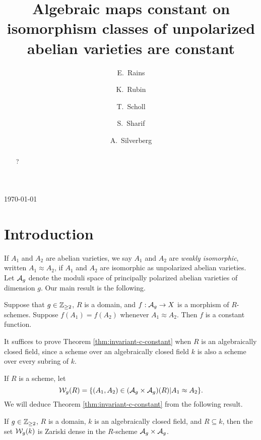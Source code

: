 \documentclass{amsart}
\title[Algebraic maps constant on unpolarized isomorphism classes]{Algebraic maps constant on isomorphism classes of unpolarized abelian varieties are constant}
\author[E.\ Rains]{E.\ Rains}
\author[K.\ Rubin]{K.\ Rubin}
\author[T.\ Scholl]{T.\ Scholl}
\author[S.\ Sharif]{S.\ Sharif}
\author[A.\ Silverberg]{A.\ Silverberg}
\begin{document}
\begin{abstract}
?
\end{abstract}


\today
\maketitle



\section{Introduction}
\label{sec:introduction}

If $A_1$ and $A_2$ are abelian varieties, we say $A_1$ and $A_2$ are \emph{weakly isomorphic}, written $A_1 \approx A_2$, if $A_1$ and $A_2$ are isomorphic as unpolarized abelian varieties. Let $\mathcal{A}_g$ denote the moduli space of principally polarized abelian varieties of dimension $g$. Our main result is the following.
\begin{theorem}\label{thm:invariant-c-constant}
  Suppose that $g\in\mathbb{Z}_{\ge 2}$, $R$ is a domain, and $f: \mathcal{A}_g \to X$ is a morphism of $R$-schemes. Suppose $f(A_1) = f(A_2)$ whenever $A_1 \approx A_2$. Then $f$ is a constant function.
\end{theorem}

It suffices to prove Theorem \ref{thm:invariant-c-constant} when $R$ is an algebraically closed field, since a scheme over an algebraically closed field $k$ is also a scheme over every subring of $k$.




If $R$ is a scheme, let
$$
\mathcal{W}_g(R) = \{(A_1,A_2) \in (\mathcal{A}_g \times \mathcal{A}_g)(R) | A_1 \approx A_2\}.
$$
We will deduce Theorem \ref{thm:invariant-c-constant} from the following result.

\begin{theorem}\label{thm:sg-c-dense}
  If $g\in\mathbb{Z}_{\ge 2}$, $R$ is a domain, $k$ is an algebraically closed field, and $R \subseteq k$, then the set $\mathcal{W}_g(k)$ is Zariski dense in the $R$-scheme $\mathcal{A}_g \times \mathcal{A}_g$.
\end{theorem}
\end{document}
